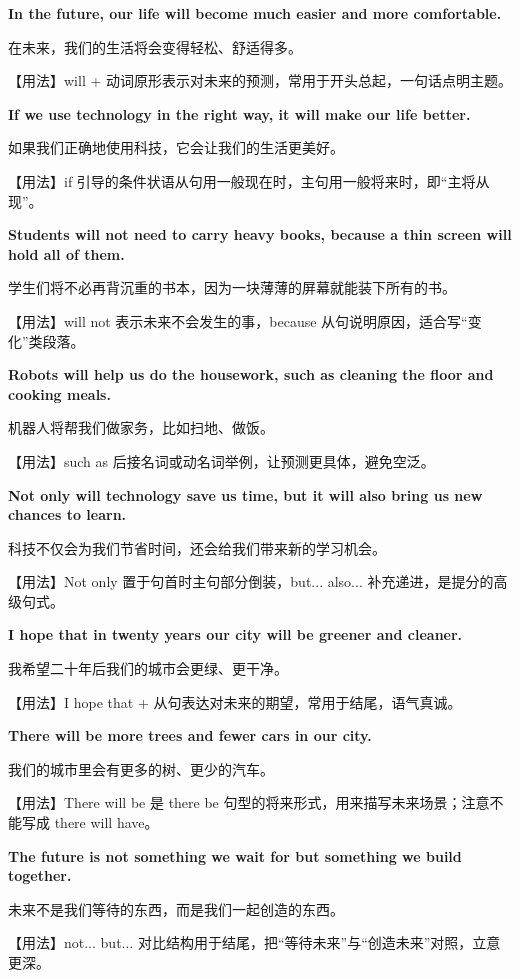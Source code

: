 \documentclass[UTF8,a4paper,11pt,oneside]{ctexbook}
\newcommand{\fansection}[1]{%
  \par\addvspace{2.4ex}%
  \Needspace{6\baselineskip}%
  \noindent{\sffamily\Large\bfseries\color{mainblue}#1}\par
  \nopagebreak
  \addvspace{0.2ex}%
  \noindent{\color{rulelight}\rule{\linewidth}{0.9pt}}\par
  \addvspace{0.9ex}%
  \nobreak
}
\newcommand{\fanpat}[3]{%
  \item{\bfseries #1}\par\nopagebreak
  {\small\color{textgray}#2}\par\nopagebreak
  {\footnotesize\color{accent!90!black}【用法】#3}\par
}
\begin{document}
\fansection{〇、本单元写作常用句型}
\begin{fanpatterns}
\fanpat{In the future, our life will become much easier and more comfortable.}{在未来，我们的生活将会变得轻松、舒适得多。}{will + 动词原形表示对未来的预测，常用于开头总起，一句话点明主题。}

\fanpat{If we use technology in the right way, it will make our life better.}{如果我们正确地使用科技，它会让我们的生活更美好。}{if 引导的条件状语从句用一般现在时，主句用一般将来时，即“主将从现”。}

\fanpat{Students will not need to carry heavy books, because a thin screen will hold all of them.}{学生们将不必再背沉重的书本，因为一块薄薄的屏幕就能装下所有的书。}{will not 表示未来不会发生的事，because 从句说明原因，适合写“变化”类段落。}

\fanpat{Robots will help us do the housework, such as cleaning the floor and cooking meals.}{机器人将帮我们做家务，比如扫地、做饭。}{such as 后接名词或动名词举例，让预测更具体，避免空泛。}

\fanpat{Not only will technology save us time, but it will also bring us new chances to learn.}{科技不仅会为我们节省时间，还会给我们带来新的学习机会。}{Not only 置于句首时主句部分倒装，but... also... 补充递进，是提分的高级句式。}

\fanpat{I hope that in twenty years our city will be greener and cleaner.}{我希望二十年后我们的城市会更绿、更干净。}{I hope that + 从句表达对未来的期望，常用于结尾，语气真诚。}

\fanpat{There will be more trees and fewer cars in our city.}{我们的城市里会有更多的树、更少的汽车。}{There will be 是 there be 句型的将来形式，用来描写未来场景；注意不能写成 there will have。}

\fanpat{The future is not something we wait for but something we build together.}{未来不是我们等待的东西，而是我们一起创造的东西。}{not... but... 对比结构用于结尾，把“等待未来”与“创造未来”对照，立意更深。}

\end{fanpatterns}

\fansection{一、满分范文}
\end{document}

